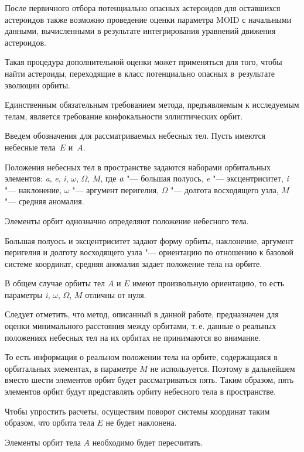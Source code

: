 После первичного отбора потенциально опасных астероидов для оставшихся астероидов также возможно проведение оценки параметра MOID с начальными данными, вычисленными в результате интегрирования уравнений движения астероидов. 

Такая процедура дополнительной оценки может применяться для того, чтобы найти астероиды, переходящие в класс потенциально опасных в~результате эволюции орбиты.



Единственным обязательным требованием метода, предъявляемым к исследуемым телам, является требование конфокальности эллиптических орбит. 

Введем обозначения для рассматриваемых небесных тел. Пусть имеются небесные тела~$E$ и~$A$. 

Положения небесных тел в пространстве задаются наборами орбитальных элементов: \emph{a}, \emph{e}, \emph{i}, $\omega$, $\Omega$, $M$, где $\emph{a}$ "--- большая полуось, \emph{e} "--- эксцентриситет,  \emph{i} "--- наклонение, $\omega$ "--- аргумент перигелия, $\Omega$ "--- долгота восходящего узла, $M$ "--- средняя аномалия. 

Элементы орбит однозначно определяют положение небесного тела. 

Большая полуось и эксцентриситет задают форму орбиты, наклонение, аргумент перигелия и долготу восходящего узла "--- ориентацию по отношению к базовой системе координат, средняя аномалия задает положение тела на орбите. 

В общем случае орбиты тел $A$ и $E$ имеют произвольную ориентацию, то есть параметры \emph{i}, $\omega$, $\Omega$, $M$ отличны от нуля.

 

Следует отметить, что метод, описанный в данной работе, предназначен для оценки минимального расстояния между орбитами, т.\,е. данные о реальных положениях небесных тел на их орбитах не принимаются во внимание. 

То есть информация о реальном положении тела на орбите, содержащаяся в орбитальных элементах, в параметре $M$ не используется. Поэтому в дальнейшем вместо шести элементов орбит будет рассматриваться пять. Таким образом, пять элементов орбит будут представлять орбиту небесного тела в пространстве.



Чтобы упростить расчеты, осуществим поворот системы координат таким образом, что орбита тела $E$ не будет наклонена. 

Элементы орбит тела $A$ необходимо будет пересчитать. 

